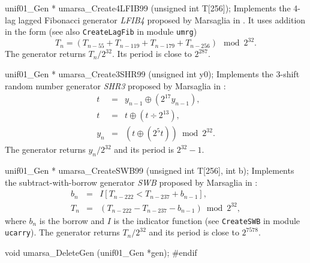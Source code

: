 unif01_Gen * umarsa_Create4LFIB99 (unsigned int T[256]);
\endcode
 \tab Implements the 4-lag lagged Fibonacci generator {\it LFIB4} proposed by
%
   Marsaglia in  \cite{rMAR99a}. It uses addition in the form
   (see also {\tt CreateLagFib} in module  {\tt umrg})
   $$
   T_{n} = (T_{n-55} + T_{n-119} + T_{n-179} + T_{n-256}) \mod 2^{32}.
   $$
   The generator returns $T_{n}/2^{32}$. Its period is close to
   $2^{287}$.
  \endtab
\code


unif01_Gen * umarsa_Create3SHR99 (unsigned int y0);
\endcode
 \tab Implements the 3-shift random number generator {\it SHR3} proposed by
%
  Marsaglia in \cite{rMAR99a}:
  \begin {eqnarray*}
   t &=& y_{n-1}\oplus \left(2^{17} y_{n-1}\right), \\
   t &=& t\oplus \left(t \div 2^{13}\right), \\
   y_{n} &=& \left(t \oplus \left(2^{5} t\right)\right) \bmod 2^{32}.
  \end {eqnarray*} 
   The generator returns $y_n/2^{32}$ and its period is $2^{32} -1$.
  \endtab
\code


unif01_Gen * umarsa_CreateSWB99 (unsigned int T[256], int b);
\endcode
 \tab Implements the subtract-with-borrow generator {\it SWB}
%
  proposed by Marsaglia in  \cite{rMAR99a}:
  \begin {eqnarray*}
   b_n &=&  I[T_{n-222} < T_{n-237} + b_{n-1}], \\
   T_{n} &=& \left(T_{n-222} - T_{n-237} - b_{n-1}\right) \bmod 2^{32},
  \end {eqnarray*} 
   where $b_n$ is the borrow and $I$ is the indicator function
   (see {\tt CreateSWB} in module  {\tt ucarry}). 
  The generator returns $T_{n}/2^{32}$ and its period is close to $2^{7578}$.
  \endtab



\code

void umarsa_DeleteGen (unif01_Gen *gen);
\endcode
 \tab \DelGen
 \endtab
\code
\hide
#endif
\endhide
\endcode
